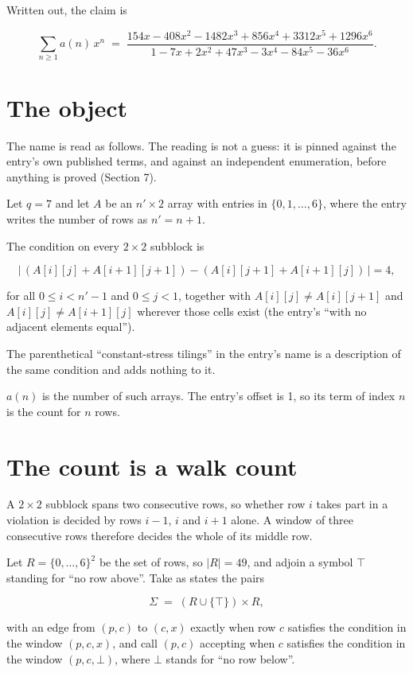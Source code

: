 \documentclass[11pt]{article}
\theoremstyle{definition}
\begin{document}
Written out, the claim is

\[\sum_{n \ge 1} a(n)\,x^n \;=\; \frac{154x - 408x^{2} - 1482x^{3} + 856x^{4} + 3312x^{5} + 1296x^{6}}{1 - 7x + 2x^{2} + 47x^{3} - 3x^{4} - 84x^{5} - 36x^{6}}.\]

\section{The object}

The name is read as follows. The reading is not a guess: it is pinned against the entry's own published terms, and against an independent enumeration, before anything is proved (Section 7).

Let $q = 7$ and let $A$ be an $n' \times 2$ array with entries in $\{0,1,\dots,6\}$, where the entry writes the number of rows as $n' = n + 1$.

The condition on every $2 \times 2$ subblock is

\[\bigl|\,(A[i][j] + A[i{+}1][j{+}1]) - (A[i][j{+}1] + A[i{+}1][j])\,\bigr| = 4,\]

for all $0 \le i < n'-1$ and $0 \le j < 1$, together with $A[i][j] \ne A[i][j{+}1]$ and $A[i][j] \ne A[i{+}1][j]$ wherever those cells exist (the entry's ``with no adjacent elements equal'').

The parenthetical ``constant-stress tilings'' in the entry's name is a description of the same condition and adds nothing to it.

$a(n)$ is the number of such arrays. The entry's offset is 1, so its term of index $n$ is the count for $n$ rows.

\section{The count is a walk count}

A $2 \times 2$ subblock spans two consecutive rows, so whether row $i$ takes part in a violation is decided by rows $i-1$, $i$ and $i+1$ alone. A window of three consecutive rows therefore decides the whole of its middle row.

Let $R = \{0,\dots,6\}^{2}$ be the set of rows, so $|R| = 49$, and adjoin a symbol $\top$ standing for ``no row above''. Take as states the pairs

\[\Sigma \;=\; (R \cup \{\top\}) \times R,\]

with an edge from $(p,c)$ to $(c,x)$ exactly when row $c$ satisfies the condition in the window $(p,c,x)$, and call $(p,c)$ accepting when $c$ satisfies the condition in the window $(p,c,\bot)$, where $\bot$ stands for ``no row below''.
\end{document}

